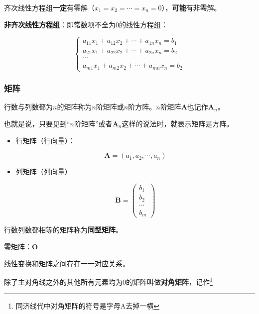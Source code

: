 \documentclass[12pt, a4paper, oneside]{ctexart}
\begin{document}
齐次线性方程组\textbf{一定}有零解（$x_1=x_2=\cdots =x_n=0$），\textbf{可能}有非零解。

\textbf{非齐次线性方程组}：即常数项不全为0的线性方程组：

\begin{equation}
  \left\{\begin{matrix}
    a_{11}x_1+a_{12}x_2+\cdots +a_{1n}x_n=b_1 \\
    a_{21}x_1+a_{22}x_2+\cdots +a_{2n}x_n=b_2 \\
    \cdots \\
    a_{m1}x_1+a_{m2}x_2+\cdots +a_{mn}x_n=b_2
   \end{matrix}\right.
\end{equation}

\subsubsection{矩阵}

行数与列数都为$n$的矩阵称为$n$阶矩阵或$n$阶方阵。$n$阶矩阵$\mathbf{A}$也记作$\mathbf{A}_n$。

也就是说，只要见到“$n$阶矩阵”或者$\mathbf{A}_n$这样的说法时，就表示矩阵是方阵。

\begin{itemize}
  \item 行矩阵（行向量）：

  \begin{equation*}
    \mathbf{A}=(a_1,a_2,\cdots,a_n)
  \end{equation*}

  \item {列矩阵（列向量）}
  
  \begin{equation*}
    \mathbf{B}=\begin{pmatrix}
      b_1 \\ 
      b_2 \\
      \cdots \\
      b_m 
     \end{pmatrix}
  \end{equation*}

\end{itemize}

行数列数都相等的矩阵称为\textbf{同型矩阵}。

零矩阵：$\mathbf{O}$

线性变换和矩阵之间存在一一对应关系。

除了主对角线之外的其他所有元素均为0的矩阵叫做\textbf{对角矩阵}，记作\footnote{同济线代中对角矩阵的符号是字母A去掉一横}
\end{document}
